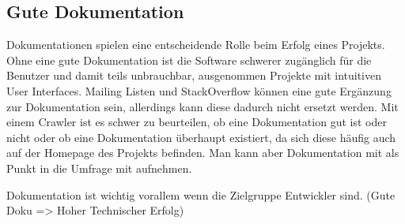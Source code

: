 \subsection{Gute Dokumentation}

\rawidea
Dokumentationen spielen eine entscheidende Rolle beim Erfolg eines Projekts.
Ohne eine gute Dokumentation ist die Software schwerer zugänglich für die Benutzer und damit teils
unbrauchbar, ausgenommen Projekte mit intuitiven User Interfaces.
Mailing Listen und StackOverflow können eine gute Ergänzung zur Dokumentation sein, allerdings kann
diese dadurch nicht ersetzt werden.
Mit einem Crawler ist es schwer zu beurteilen, ob eine Dokumentation gut ist oder nicht oder ob
eine Dokumentation überhaupt existiert, da sich diese häufig auch auf der Homepage des Projekts befinden.
Man kann aber Dokumentation mit als Punkt in die Umfrage mit aufnehmen.

\bigskip


\begin{hypothesis}
    Dokumentation ist wichtig vorallem wenn die Zielgruppe Entwickler sind.
    (Gute Doku => Hoher Technischer Erfolg)
\end{hypothesis}
